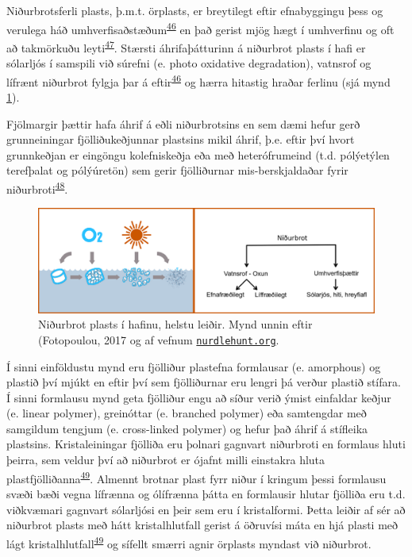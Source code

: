 \documentclass[icelandic,]{book}
\begin{document}
Niðurbrotsferli plasts, þ.m.t. örplasts, er breytilegt eftir efnabyggingu þess og verulega háð umhverfisaðstæðum\textsuperscript{\protect\hyperlink{ref-gewert2015pathways}{46}} en það gerist mjög hægt í umhverfinu og oft að takmörkuðu leyti\textsuperscript{\protect\hyperlink{ref-barnes2009accumulation}{47}}. Stærsti áhrifaþátturinn á niðurbrot plasts í hafi er sólarljós í samspili við súrefni (e. photo oxidative degradation), vatnsrof og lífrænt niðurbrot fylgja þar á eftir\textsuperscript{\protect\hyperlink{ref-gewert2015pathways}{46}} og hærra hitastig hraðar ferlinu (sjá mynd \ref{fig:flowchart}).

Fjölmargir þættir hafa áhrif á eðli niðurbrotsins en sem dæmi hefur gerð grunneiningar fjölliðukeðjunnar plastsins mikil áhrif, þ.e. eftir því hvort grunnkeðjan er eingöngu kolefniskeðja eða með heterófrumeind (t.d. pólýetýlen terefþalat og pólýúretön) sem gerir fjölliðurnar mis-berskjaldaðar fyrir niðurbroti\textsuperscript{\protect\hyperlink{ref-Singh2008}{48}}.

\begin{figure}[H]

{\centering \includegraphics[width=1\linewidth]{myndir/small-plastics_FLAEDIRIT} 

}

\caption{Niðurbrot plasts í hafinu, helstu leiðir. Mynd unnin eftir (Fotopoulou, 2017 og af vefnum \href{https://www.nurdlehunt.org.uk/}{\nolinkurl{nurdlehunt.org}}.}\label{fig:flowchart}
\end{figure}

Í sinni einföldustu mynd eru fjölliður plastefna formlausar (e. amorphous) og plastið því mjúkt en eftir því sem fjölliðurnar eru lengri þá verður plastið stífara. Í sinni formlausu mynd geta fjölliður engu að síður verið ýmist einfaldar keðjur (e. linear polymer), greinóttar (e. branched polymer) eða samtengdar með samgildum tengjum (e. cross-linked polymer) og hefur það áhrif á stífleika plastsins. Kristaleiningar fjölliða eru þolnari gagnvart niðurbroti en formlaus hluti þeirra, sem veldur því að niðurbrot er ójafnt milli einstakra hluta plastfjölliðanna\textsuperscript{\protect\hyperlink{ref-andrady2017plastic}{49}}. Almennt brotnar plast fyrr niður í kringum þessi formlausu svæði bæði vegna lífrænna og ólífrænna þátta en formlausir hlutar fjölliða eru t.d. viðkvæmari gagnvart sólarljósi en þeir sem eru í kristalformi. Þetta leiðir af sér að niðurbrot plasts með hátt kristalhlutfall gerist á öðruvísi máta en hjá plasti með lágt kristalhlutfall\textsuperscript{\protect\hyperlink{ref-andrady2017plastic}{49}} og sífellt smærri agnir örplasts myndast við niðurbrot.
\end{document}
